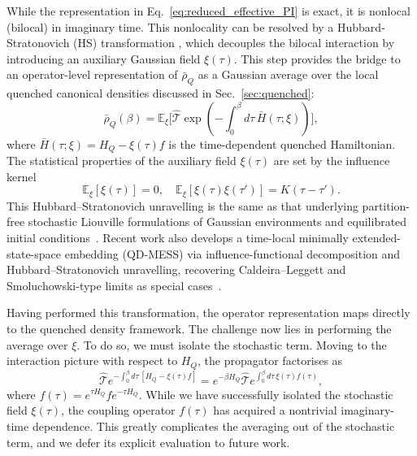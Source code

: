 While the representation in Eq.~\eqref{eq:reduced_effective_PI} is exact, it is nonlocal (bilocal) in imaginary time. This nonlocality can be resolved by a Hubbard-Stratonovich (HS) transformation \cite{hubbardCalculationPartitionFunctions1959a, stratonovich1957QDistro}, which decouples the bilocal interaction by introducing an auxiliary Gaussian field $\xi(\tau)$. This step provides the bridge to an operator-level representation of $\bar{\rho}_Q$ as a Gaussian average over the local quenched canonical densities discussed in Sec.~\ref{sec:quenched}:
\begin{equation}
    \bar{\rho}_Q(\beta) = \mathbb{E}_\xi\bigg[\hat{\mathcal{T}}\exp\!\left(-\int_0^\beta d\tau\,\bar{H}(\tau;\xi)\right) \bigg],
    \label{eq:bar_rho_as_quenched_average}
\end{equation}
where $\bar{H}(\tau;\xi) = H_Q - \xi(\tau)f$ is the time-dependent quenched Hamiltonian.
The statistical properties of the auxiliary field $\xi(\tau)$ are set by the influence kernel \cite{mccaulPartitionfreeApproachOpen2017c,mccaulDrivingSpinbosonModels2018a,mccaulHowWinFriends2021b}
\begin{equation}
    \mathbb{E}_\xi[\xi(\tau)] = 0, \quad \mathbb{E}_\xi[\xi(\tau)\xi(\tau')] = K(\tau-\tau').
    \label{eq:noise_statistics}
\end{equation}
This Hubbard--Stratonovich unravelling is the same as that underlying partition-free stochastic Liouville formulations of Gaussian environments and equilibrated initial conditions~\cite{mccaulPartitionfreeApproachOpen2017c}. Recent work also develops a time-local minimally extended-state-space embedding (QD-MESS) via influence-functional decomposition and Hubbard–Stratonovich unravelling, recovering Caldeira–Leggett and Smoluchowski-type limits as special cases~\cite{XuAnkerholdEPJST2025}.

Having performed this transformation, the operator representation maps directly to the quenched density framework. The challenge now lies in performing the average over $\xi$. To do so, we must isolate the stochastic term. Moving to the interaction picture with respect to $H_Q$, the propagator factorises as
\begin{equation}
    \hat{\mathcal{T}}e^{-\int_0^\beta d\tau\,[H_Q - \xi(\tau)f]} = e^{-\beta H_Q} \hat{\mathcal{T}}e^{\int_0^\beta d\tau\, \xi(\tau) f(\tau)},
    \label{eq:interaction_picture_split}
\end{equation}
where $f(\tau) = e^{\tau H_Q} f e^{-\tau H_Q}$. While we have successfully isolated the stochastic field $\xi(\tau)$, the coupling operator $f(\tau)$ has acquired a nontrivial imaginary-time dependence. This greatly complicates the averaging out of the stochastic term, and we defer its explicit evaluation to future work. 

